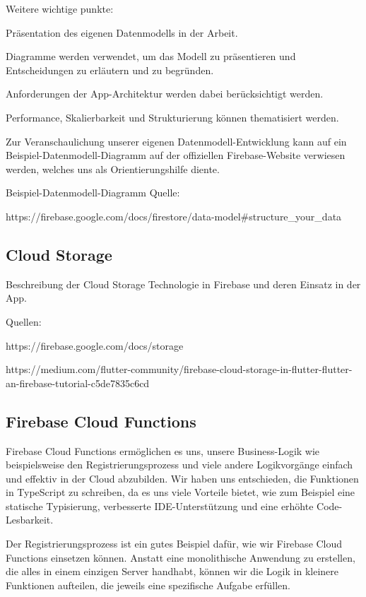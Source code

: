 Weitere wichtige punkte:

\begin{compactitem}
    \item Präsentation des eigenen Datenmodells in der Arbeit.
    \item Diagramme werden verwendet, um das Modell zu präsentieren und Entscheidungen zu erläutern und zu begründen.
    \item Anforderungen der App-Architektur werden dabei berücksichtigt werden.
    \item Performance, Skalierbarkeit und Strukturierung können thematisiert werden.
    \item Zur Veranschaulichung unserer eigenen Datenmodell-Entwicklung kann auf ein Beispiel-Datenmodell-Diagramm auf der offiziellen Firebase-Website verwiesen werden, welches uns als Orientierungshilfe diente.
\end{compactitem}

Beispiel-Datenmodell-Diagramm Quelle:

https://firebase.google.com/docs/firestore/data-model\#structure\_your\_data

\subsection{Cloud Storage}

Beschreibung der Cloud Storage Technologie in Firebase und deren Einsatz in der App.

Quellen:

https://firebase.google.com/docs/storage

https://medium.com/flutter-community/firebase-cloud-storage-in-flutter-flutter-an-firebase-tutorial-c5de7835c6cd

\subsection{Firebase Cloud Functions}
Firebase Cloud Functions\cite{firebase-cloud-functions} ermöglichen es uns, unsere Business-Logik wie beispielsweise den Registrierungsprozess und viele andere Logikvorgänge einfach und effektiv in der Cloud abzubilden. Wir haben uns entschieden, die Funktionen in TypeScript zu schreiben, da es uns viele Vorteile bietet, wie zum Beispiel eine statische Typisierung, verbesserte IDE-Unterstützung und eine erhöhte Code-Lesbarkeit.

Der Registrierungsprozess ist ein gutes Beispiel dafür, wie wir Firebase Cloud Functions einsetzen können. Anstatt eine monolithische Anwendung zu erstellen, die alles in einem einzigen Server handhabt, können wir die Logik in kleinere Funktionen aufteilen, die jeweils eine spezifische Aufgabe erfüllen. 

